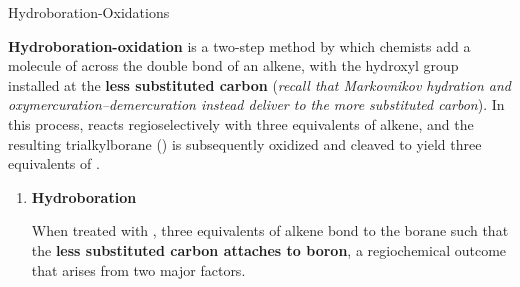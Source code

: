 \documentclass[10pt]{article}
\begin{document}
      \begin{core}[label=core:alkene_hydro_oxi]{Hydroboration-Oxidations}

        \textbf{Hydroboration-oxidation} is a two-step method by which chemists add a molecule of  across the double bond of an alkene, with the hydroxyl group installed at the \textbf{less substituted carbon} (\textit{recall that Markovnikov hydration and oxymercuration--demercuration instead deliver  to the more substituted carbon}). In this process,  reacts regioselectively with three equivalents of alkene, and the resulting trialkylborane () is subsequently oxidized and cleaved to yield three equivalents of .


        \begin{enumerate}[label=(\arabic*)]

          \item \textbf{Hydroboration} 

          When treated with , three equivalents of alkene bond to the borane such that the \textbf{less substituted carbon attaches to boron}, a regiochemical outcome that arises from two major factors.



\end{enumerate}
\end{core}
\end{document}

